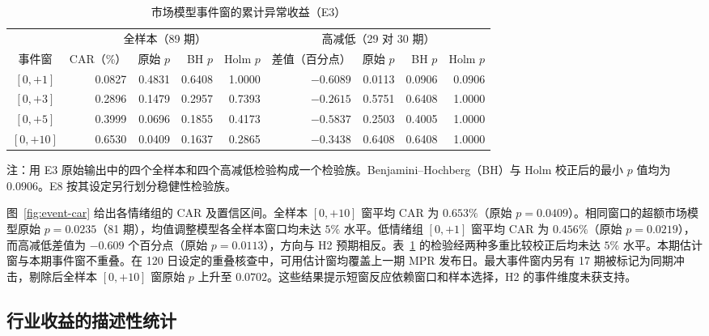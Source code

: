 \begin{table}[htbp]
  \centering\small
  \caption{市场模型事件窗的累计异常收益（E3）}
  \label{tab:event-results}
  \setlength{\tabcolsep}{4pt}
  \begin{tabular}{@{}crrrrrrrr@{}}
    \toprule
    & \multicolumn{4}{c}{全样本（89 期）} & \multicolumn{4}{c}{高减低（29 对 30 期）} \\
    \cmidrule(lr){2-5}\cmidrule(lr){6-9}
    事件窗 & CAR（\%） & 原始 $p$ & BH $p$ & Holm $p$ & 差值（百分点） & 原始 $p$ & BH $p$ & Holm $p$ \\
    \midrule
    $[0,+1]$  & 0.0827 & 0.4831 & 0.6408 & 1.0000 & $-0.6089$ & 0.0113 & 0.0906 & 0.0906 \\
    $[0,+3]$  & 0.2896 & 0.1479 & 0.2957 & 0.7393 & $-0.2615$ & 0.5751 & 0.6408 & 1.0000 \\
    $[0,+5]$  & 0.3999 & 0.0696 & 0.1855 & 0.4173 & $-0.5837$ & 0.2503 & 0.4005 & 1.0000 \\
    $[0,+10]$ & 0.6530 & 0.0409 & 0.1637 & 0.2865 & $-0.3438$ & 0.6408 & 0.6408 & 1.0000 \\
    \bottomrule
  \end{tabular}
  \par\smallskip
  \parbox{.92\linewidth}{\footnotesize 注：用 E3 原始输出中的四个全样本和四个高减低检验构成一个检验族。Benjamini--Hochberg（BH）与 Holm 校正后的最小 $p$ 值均为 $0.0906$。E8 按其设定另行划分稳健性检验族。}
\end{table}

图~\ref{fig:event-car} 给出各情绪组的 CAR 及置信区间。全样本 $[0,+10]$ 窗平均 CAR 为 $0.653\%$（原始 $p=0.0409$）。相同窗口的超额市场模型原始 $p=0.0235$（81 期），均值调整模型各全样本窗口均未达 $5\%$ 水平。低情绪组 $[0,+1]$ 窗平均 CAR 为 $0.456\%$（原始 $p=0.0219$），而高减低差值为 $-0.609$ 个百分点（原始 $p=0.0113$），方向与 H2 预期相反。表~\ref{tab:event-results} 的检验经两种多重比较校正后均未达 $5\%$ 水平。本期估计窗与本期事件窗不重叠。在 120 日设定的重叠核查中，可用估计窗均覆盖上一期 MPR 发布日。最大事件窗内另有 17 期被标记为同期冲击，剔除后全样本 $[0,+10]$ 窗原始 $p$ 上升至 $0.0702$。这些结果提示短窗反应依赖窗口和样本选择，H2 的事件维度未获支持。


\subsection{行业收益的描述性统计}

